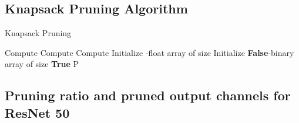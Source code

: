 \documentclass{article}
\begin{document}
\subsection{Knapsack Pruning Algorithm}
\begin{algorithm}[H]
\caption{Knapsack Pruning}
\label{alg:pruning}
\begin{algorithmic}
\INPUT 
\FORALL{}
    \STATE Compute  \STATE Compute  \ENDFOR
\STATE Compute 
\FORALL{}
    \STATE 
\ENDFOR
\STATE 
\STATE Initialize  -float array of size 
\STATE Initialize  \textbf{False}-binary array of size 
\FORALL{}
    \STATE 
    \STATE 
    \FORALL{}
        \IF{}
            \STATE 
        \ELSE
            \STATE 
        \ENDIF
        \STATE 
            \STATE 
            \STATE  \textbf{True}
        \ELSE
            \STATE 
        \ENDIF
    \ENDFOR
\ENDFOR
\STATE 
{}
        \STATE 
        \STATE 
    \ENDIF
\ENDFOR
\OUTPUT P
\end{algorithmic}
\end{algorithm}
\newpage
\subsection{Pruning ratio and pruned output channels for ResNet 50 }
\end{document}
